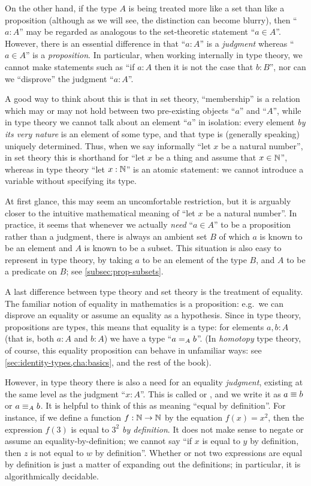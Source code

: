 On the other hand, if the type $A$ is being treated more like a set than like a proposition (although as we will see, the distinction can become blurry), then ``$a:A$'' may be regarded as analogous to the set-theoretic statement ``$a\in A$''.
However, there is an essential difference in that ``$a:A$'' is a \emph{judgment} whereas ``$a\in A$'' is a \emph{proposition}.
In particular, when working internally in type theory, we cannot make statements such as ``if $a:A$ then it is not the case that $b:B$'', nor can we ``disprove'' the judgment ``$a:A$''.

A good way to think about this is that in set theory, ``membership'' is a relation which may or may not hold between two pre-existing objects ``$a$'' and ``$A$'', while in type theory we cannot talk about an element ``$a$'' in isolation: every element \emph{by its very nature} is an element of some type, and that type is (generally speaking) uniquely determined.
Thus, when we say informally ``let $x$ be a natural number'', in set theory this is shorthand for ``let $x$ be a thing and assume that $x\in\nat$'', whereas in type theory ``let $x:\nat$'' is an atomic statement: we cannot introduce a variable without specifying its type.

At first glance, this may seem an uncomfortable restriction, but it is arguably closer to the intuitive mathematical meaning of ``let $x$ be a natural number''.
In practice, it seems that whenever we actually \emph{need} ``$a\in A$'' to be a proposition rather than a judgment, there is always an ambient set $B$ of which $a$ is known to be an element and $A$ is known to be a subset.
This situation is also easy to represent in type theory, by taking $a$ to be an element of the type $B$, and $A$ to be a predicate on $B$; see \autoref{subsec:prop-subsets}.

A last difference between type theory and set theory is the treatment of equality.
The familiar notion of equality in mathematics is a proposition: e.g.\ we can disprove an equality or assume an equality as a hypothesis.
Since in type theory, propositions are types, this means that equality is a type: for elements $a,b:A$ (that is, both $a:A$ and $b:A$) we have a type ``$\id[A]ab$''.
(In \emph{homotopy} type theory, of course, this equality proposition can behave in unfamiliar ways: see \autoref{sec:identity-types,cha:basics}, and the rest of the book).

However, in type theory there is also a need for an equality \emph{judgment}, existing at the same level as the judgment ``$x:A$''.
%
This is called  or , and we write it as $a\jdeq b$ or $a \jdeq_A b$.
It is helpful to think of this as meaning ``equal by definition''.
For instance, if we define a function $f:\nat\to\nat$ by the equation $f(x)=x^2$, then the expression $f(3)$ is equal to $3^2$ \emph{by definition}.
It does not make sense to negate or assume an equality-by-definition; we cannot say ``if $x$ is equal to $y$ by definition, then $z$ is not equal to $w$ by definition''.
Whether or not two expressions are equal by definition is just a matter of expanding out the definitions; in particular, it is algorithmically decidable.


